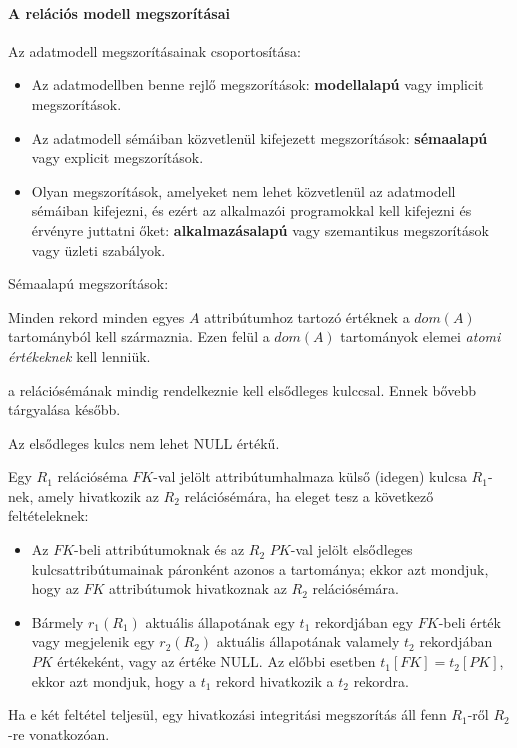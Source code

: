 \paragraph{A relációs modell megszorításai}
Az adatmodell megszorításainak csoportosítása:
\begin{itemize}[nosep]
	\item Az adatmodellben benne rejlő megszorítások: \textbf{modellalapú} vagy implicit megszorítások.
	\item Az adatmodell sémáiban közvetlenül kifejezett megszorítások: \textbf{sémaalapú} vagy explicit megszorítások.
	\item Olyan megszorítások, amelyeket nem lehet közvetlenül az adatmodell sémáiban kifejezni, és ezért az alkalmazói programokkal kell kifejezni és érvényre juttatni őket: \textbf{alkalmazásalapú} vagy szemantikus megszorítások vagy üzleti szabályok.
\end{itemize}
Sémaalapú megszorítások:
\begin{description}[nosep]
	\item[Tartomány megszorítás] Minden rekord minden egyes $A$ attribútumhoz tartozó értéknek a $dom(A)$ tartományból kell származnia. Ezen felül a $dom(A)$ tartományok elemei \emph{atomi értékeknek} kell lenniük.
	\item[Kulcs megszorítás] a relációsémának mindig rendelkeznie kell elsődleges kulccsal. Ennek bővebb tárgyalása később.
	\item[Egyedintegritási megszorítás] Az elsődleges kulcs nem lehet NULL értékű.
	\item[Hivatkozási integritási megszorítás] Egy $R_1$ relációséma $FK$-val jelölt attribútumhalmaza külső (idegen) kulcsa $R_1$-nek, amely hivatkozik az $R_2$ relációsémára, ha eleget tesz a következő feltételeknek:
	\begin{itemize}
		\item Az $FK$-beli attribútumoknak és az $R_2$ $PK$-val jelölt elsődleges kulcsattribútumainak páronként azonos a tartománya; ekkor azt mondjuk, hogy az $FK$ attribútumok hivatkoznak az $R_2$ relációsémára.
		\item Bármely $r_1(R_1)$ aktuális állapotának egy $t_1$ rekordjában egy $FK$-beli érték vagy megjelenik egy $r_2(R_2)$ aktuális állapotának valamely $t_2$ rekordjában $PK$ értékeként, vagy az értéke NULL. Az előbbi esetben $t_1[FK] = t_2[PK]$, ekkor azt mondjuk, hogy a $t_1$ rekord hivatkozik a $t_2$ rekordra.
	\end{itemize}
	Ha e két feltétel teljesül, egy hivatkozási integritási megszorítás áll fenn $R_1$-ről $R_2$-re vonatkozóan.
\end{description}
